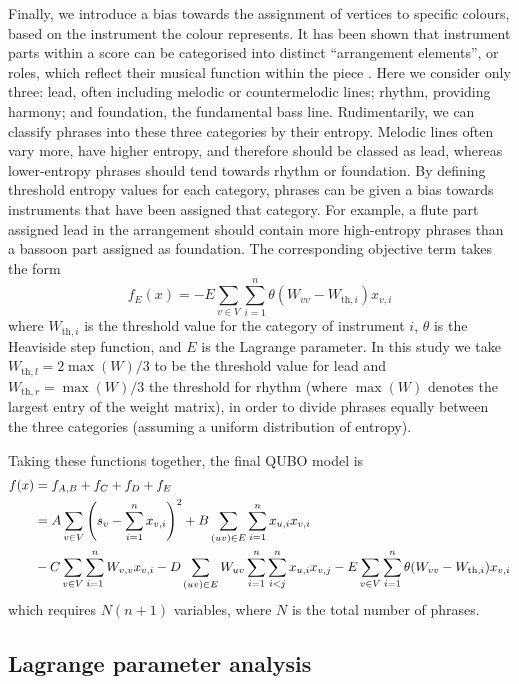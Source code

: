 \documentclass[twocolumn]{article}
\theoremstyle{definition}
\begin{document}
Finally, we introduce a bias towards the assignment of vertices to specific colours, based on the instrument the colour represents. It has been shown that instrument parts within a score can be categorised into distinct ``arrangement elements'', or roles, which reflect their musical function within the piece \cite{owsinski_mixing_2017}. Here we consider only three: lead, often including melodic or countermelodic lines; rhythm, providing harmony; and foundation, the fundamental bass line. Rudimentarily, we can classify phrases into these three categories by their entropy. Melodic lines often vary more, have higher entropy, and therefore should be classed as lead, whereas lower-entropy phrases should tend towards rhythm or foundation. By defining threshold entropy values for each category, phrases can be given a bias towards instruments that have been assigned that category. For example, a flute part assigned lead in the arrangement should contain more high-entropy phrases than a bassoon part assigned as foundation. The corresponding objective term takes the form
\begin{equation}
    f_E(x) = -E\sum_{v\in V}\sum_{i=1}^n \theta(W_{vv} - W_{\text{th},i})x_{v,i}
\end{equation}
where $W_{\text{th},i}$ is the threshold value for the category of instrument $i$, $\theta$ is the Heaviside step function, and $E$ is the Lagrange parameter. In this study we take ${W_{\text{th},l}=2\max(W)/3}$ to be the threshold value for lead and ${W_{\text{th},r}=\max(W)/3}$ the threshold for rhythm (where $\max(W)$ denotes the largest entry of the weight matrix), in order to divide phrases equally between the three categories (assuming a uniform distribution of entropy).

Taking these functions together, the final QUBO model is
\begin{align}
    f(x)&=f_{A,B}+f_C+f_D+f_E \notag\\
    &=A\sum_{v \in V}\left(s_v-\sum_{i=1}^{n} x_{v,i}\right)^2+B\sum_{(uv) \in E}\sum_{i=1}^n x_{u,i}x_{v,i} \notag\\
    &-C\sum_{v \in V}\sum_{i=1}^n W_{v,v}x_{v,i}-D\sum_{(uv)\in E}W_{uv}\sum_{i=1}^n\sum_{i<j}^n x_{u,i}x_{v,j}-E\sum_{v \in V}\sum_{i=1}^n\theta(W_{vv}-W_{\text{th},i})x_{v,i}
    \label{eq:problem-qubo}
\end{align}
which requires $N(n+1)$ variables, where $N$ is the total number of phrases.

\subsection{Lagrange parameter analysis}
\end{document}
